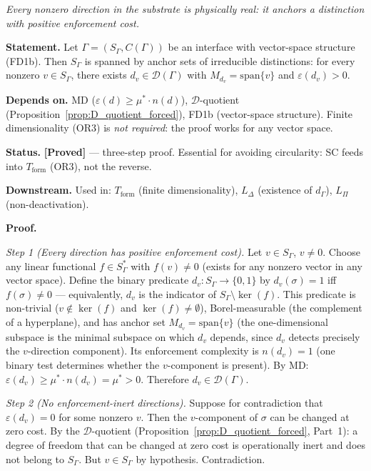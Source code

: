 \documentclass[11pt]{article}
\theoremstyle{remark}
\begin{document}
\begin{tcolorbox}[apfbox, title={Proposition SC (Substrate Completeness)}]
\label{prop:SC}
\textit{Every nonzero direction in the substrate is physically real: it anchors a distinction with positive enforcement cost.}

\smallskip\noindent\textbf{Statement.}  Let $\Gamma = (S_\Gamma, C(\Gamma))$ be an interface with vector-space structure (FD1b).  Then $S_\Gamma$ is spanned by anchor sets of irreducible distinctions: for every nonzero $v \in S_\Gamma$, there exists $d_v \in \mathcal{D}(\Gamma)$ with $M_{d_v} = \mathrm{span}\{v\}$ and $\varepsilon(d_v) > 0$.

\smallskip\noindent\textbf{Depends on.}  MD ($\varepsilon(d) \ge \mu^* \cdot n(d)$), $\mathcal{D}$-quotient (Proposition~\ref{prop:D_quotient_forced}), FD1b (vector-space structure).  Finite dimensionality (OR3) is \emph{not required}: the proof works for any vector space.

\smallskip\noindent\textbf{Status.}  \textbf{[Proved]} --- three-step proof.  Essential for avoiding circularity: SC feeds into $T_{\mathrm{form}}$ (OR3), not the reverse.

\smallskip\noindent\textbf{Downstream.}  Used in: $T_{\mathrm{form}}$ (finite dimensionality), $L_\Delta$ (existence of $d_\Gamma$), $L_\Pi$ (non-deactivation).

\smallskip\noindent\textbf{Proof.}

\textit{Step 1 (Every direction has positive enforcement cost).}  Let $v \in S_\Gamma$, $v \ne 0$.  Choose any linear functional $f \in S_\Gamma^*$ with $f(v) \ne 0$ (exists for any nonzero vector in any vector space).  Define the binary predicate $d_v: S_\Gamma \to \{0,1\}$ by $d_v(\sigma) = 1$ iff $f(\sigma) \ne 0$ --- equivalently, $d_v$ is the indicator of $S_\Gamma \setminus \ker(f)$.  This predicate is non-trivial ($v \notin \ker(f)$ and $\ker(f) \ne \emptyset$), Borel-measurable (the complement of a hyperplane), and has anchor set $M_{d_v} = \mathrm{span}\{v\}$ (the one-dimensional subspace is the minimal subspace on which $d_v$ depends, since $d_v$ detects precisely the $v$-direction component).  Its enforcement complexity is $n(d_v) = 1$ (one binary test determines whether the $v$-component is present).  By MD: $\varepsilon(d_v) \ge \mu^* \cdot n(d_v) = \mu^* > 0$.  Therefore $d_v \in \mathcal{D}(\Gamma)$.

\textit{Step 2 (No enforcement-inert directions).}  Suppose for contradiction that $\varepsilon(d_v) = 0$ for some nonzero $v$.  Then the $v$-component of $\sigma$ can be changed at zero cost.  By the $\mathcal{D}$-quotient (Proposition~\ref{prop:D_quotient_forced}, Part~1): a degree of freedom that can be changed at zero cost is operationally inert and does not belong to $S_\Gamma$.  But $v \in S_\Gamma$ by hypothesis.  Contradiction.


\end{tcolorbox}
\end{document}
